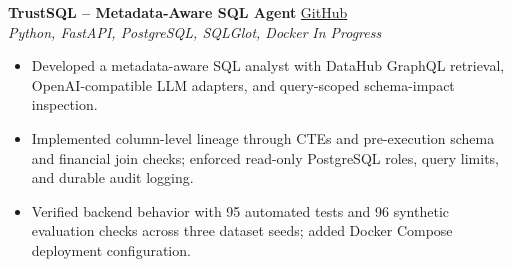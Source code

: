 \noindent
\textbf{TrustSQL -- Metadata-Aware SQL Agent}
\hfill
\href{https://github.com/Stark2028/trustsql}{GitHub}\\
\textit{Python, FastAPI, PostgreSQL, SQLGlot, Docker}
\hfill \textit{In Progress}

\begin{itemize}
  \item Developed a metadata-aware SQL analyst with DataHub GraphQL
        retrieval, OpenAI-compatible LLM adapters, and query-scoped
        schema-impact inspection.
  \item Implemented column-level lineage through CTEs and pre-execution
        schema and financial join checks; enforced read-only PostgreSQL
        roles, query limits, and durable audit logging.
  \item Verified backend behavior with 95 automated tests and 96
        synthetic evaluation checks across three dataset seeds;
        added Docker Compose deployment configuration.
\end{itemize}
